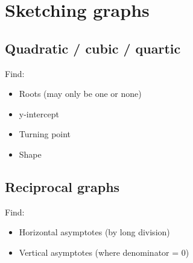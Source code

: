 \section{Sketching graphs}
\subsection{Quadratic / cubic / quartic}
Find:
\begin{itemize}
    \item Roots (may only be one or none)
    \item y-intercept
    \item Turning point
    \item Shape
\end{itemize}

\subsection{Reciprocal graphs}
Find:
\begin{itemize}
    \item Horizontal asymptotes (by long division)
    \item Vertical asymptotes (where denominator = $0$)
\end{itemize}